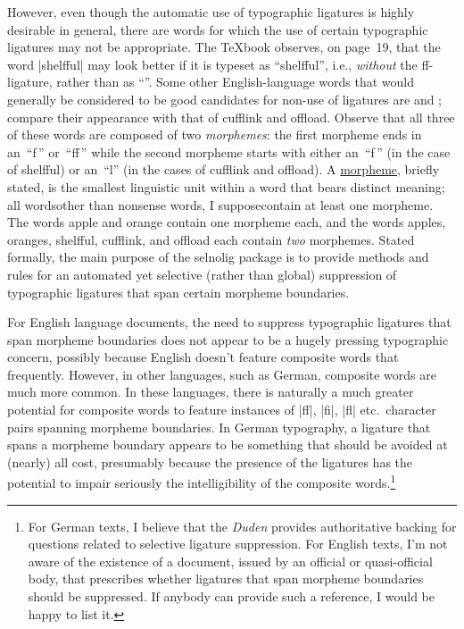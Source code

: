 \documentclass[11pt]{article}
\newcommand{\pkg}[1]{\textsf{#1}}
\begin{document}
However, even though the automatic use of typographic ligatures is highly desirable in general, there are words for which the use of certain typographic ligatures may not be appropriate. The \TeX book observes, on page~19, that the word |shelfful| may look better if it is typeset as \enquote{shelfful}, i.e., \emph{without} the ff-ligature, rather than as \enquote{}. Some other English-language words that would generally be considered to be good candidates for non-use of ligatures are  and ; compare their appearance with that of cufflink and offload. Observe that all three of these words are composed of two \emph{morphemes}: the first morpheme ends in an~\enquote{f\,} or~\enquote{ff\,} while the second morpheme starts with either an~\enquote{f\,} (in the case of shelfful) or an~\enquote{l} (in the cases of cufflink and offload). A \href{http://en.wikipedia.org/wiki/Morpheme}{morpheme}, briefly stated, is the smallest linguistic unit within a word that bears distinct meaning; all words\textemdash other than nonsense words, I suppose\textemdash contain at least one morpheme. The words apple and orange contain one morpheme each, and the words apples, oranges, shelfful, cufflink, and offload each contain \emph{two} morphemes. Stated formally, the main purpose of the \pkg{selnolig} package is to provide methods and rules for an automated yet selective (rather than global) suppression of typographic ligatures that span certain morpheme boundaries.

For English language documents, the need to suppress typographic ligatures that span morpheme boundaries does not appear to be a hugely pressing typographic concern, possibly because English doesn't feature composite words that frequently. However, in other languages, such as German, composite words are much more common. In these languages, there is naturally a much greater potential for composite words to feature instances of |ff|, |fi|, |fl| etc.\ character pairs spanning morpheme boundaries. In German typography, a ligature that spans a morpheme boundary appears to be something that should be avoided at (nearly) all cost, presumably because the presence of the ligatures has the potential to impair seriously the intelligibility of the composite words.\footnote{For German texts, I believe that the \emph{Duden} provides authoritative backing for questions related to selective ligature suppression. For English texts, I'm not aware of the existence of a document, issued by an official or quasi-official body, that prescribes whether ligatures that span morpheme boundaries should be suppressed. If anybody can provide such a reference, I would be happy to list it.}
\end{document}
